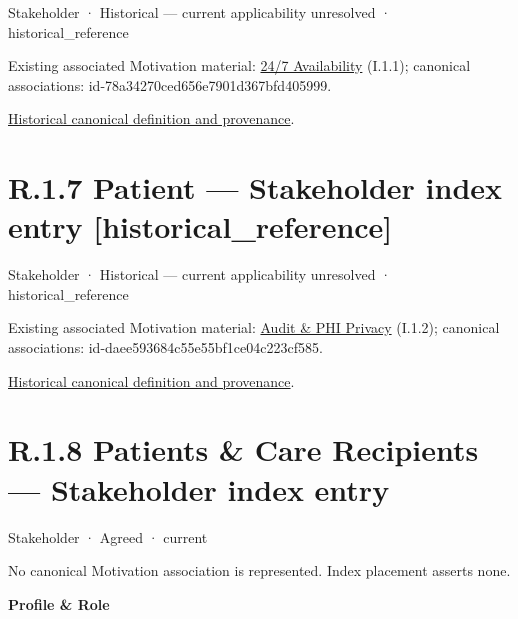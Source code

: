 \label{element:2018200a493d458096b72031cc2ae779}
{\small Stakeholder · Historical — current applicability unresolved · historical\_reference}\par
{\small Existing associated Motivation material: \hyperref[element:782f53e2190f4a8a8d0dc0a33cd6fbb3]{24/7 Availability} (I.1.1); canonical associations: id-78a34270ced656e7901d367bfd405999.}\par
\href{../../../../../../../continuum/motivation/stakeholder/2018200a493d458096b72031cc2ae779.md}{Historical canonical definition and provenance}.\par
\section*{R.1.7 Patient — Stakeholder index entry [historical\_reference]}
\label{navigation:R.1.7}

\label{element:5f6d333e94634420b8a8bbf8b9cb6e2a}
{\small Stakeholder · Historical — current applicability unresolved · historical\_reference}\par
{\small Existing associated Motivation material: \hyperref[element:499313a0a5d84520a3061120ae9b6dac]{Audit \& PHI Privacy} (I.1.2); canonical associations: id-daee593684c55e55bf1ce04c223cf585.}\par
\href{../../../../../../../continuum/motivation/stakeholder/5f6d333e94634420b8a8bbf8b9cb6e2a.md}{Historical canonical definition and provenance}.\par
\section*{R.1.8 Patients \& Care Recipients — Stakeholder index entry}
\label{navigation:R.1.8}

\label{element:ea5a315450ce4cfb87417263560c2b6d}
{\small Stakeholder · Agreed · current}\par
No canonical Motivation association is represented. Index placement asserts none.\par

\par\medskip\textbf{Profile \& Role}\par


